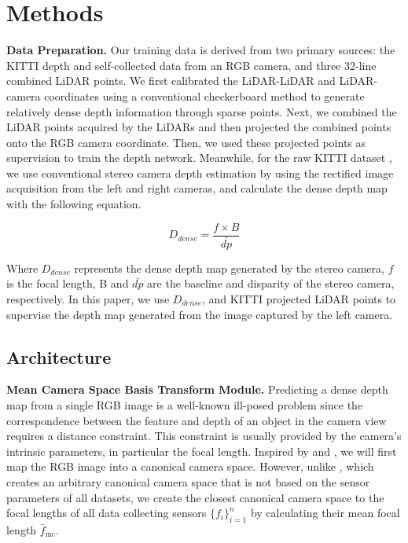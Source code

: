 \documentclass{article}
\begin{document}
\section{Methods}\label{sec:methods}
    \textbf{Data Preparation.} Our training data is derived from two primary sources: the KITTI depth\cite{kittdepthbenchmard} and self-collected data from an RGB camera, and three 32-line combined LiDAR points. We first calibrated the LiDAR-LiDAR and LiDAR-camera coordinates using a conventional checkerboard method to generate relatively dense depth information through sparse points. Next, we combined the LiDAR points acquired by the LiDARs and then projected the combined points onto the RGB camera coordinate. Then, we used these projected points as supervision to train the depth network. Meanwhile, for the raw KITTI dataset \cite{rawkitti}, we use conventional stereo camera depth estimation by using the rectified image acquisition from the left and right cameras, and calculate the dense depth map with the following equation.

    \begin{equation}
        D_{dense} = \frac{f \times B} {\bar{dp}}
    \end{equation}

    Where \(D_{dense}\) represents the dense depth map generated by the stereo camera, \(f\) is the focal length, B and \(\bar{dp}\) are the baseline and disparity of the stereo camera, respectively. In this paper, we use \(D_{dense}\), and KITTI projected LiDAR points to supervise the depth map generated from the image captured by the left camera.

\subsection{Architecture}
\textbf{Mean Camera Space Basis Transform Module.} Predicting a dense depth map from a single RGB image is a well-known ill-posed problem since the correspondence between the feature and depth of an object in the camera view requires a distance constraint. This constraint is usually provided by the camera's intrinsic parameters, in particular the focal length. Inspired by \cite{yin2023metric} and \cite{hu2024metric3dv2}, we will first map the RGB image into a canonical camera space. However, unlike \cite{yin2023metric,hu2024metric3dv2}, which creates an arbitrary canonical camera space that is not based on the sensor parameters of all datasets, we create the closest canonical camera space to the focal lengths of all data collecting sensors \( \{f_i\}_{i=1}^n \) by calculating their mean focal length \(\bar{f}_{\text{mc}}\). 
\end{document}
